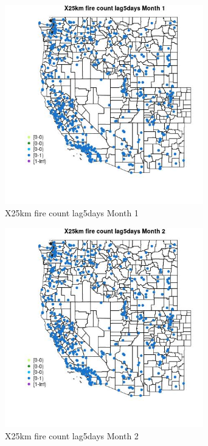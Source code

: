 \begin{figure} 
\centering  
\includegraphics[width=0.77\textwidth]{Code_Outputs/Report_ML_input_PM25_Step4_part_e_de_duplicated_aves_compiled_2019-05-14wNAs_MapObsMo1X25km_fire_count_lag5days.jpg} 
\caption{\label{fig:Report_ML_input_PM25_Step4_part_e_de_duplicated_aves_compiled_2019-05-14wNAsMapObsMo1X25km_fire_count_lag5days}X25km fire count lag5days Month 1} 
\end{figure} 
 

\begin{figure} 
\centering  
\includegraphics[width=0.77\textwidth]{Code_Outputs/Report_ML_input_PM25_Step4_part_e_de_duplicated_aves_compiled_2019-05-14wNAs_MapObsMo2X25km_fire_count_lag5days.jpg} 
\caption{\label{fig:Report_ML_input_PM25_Step4_part_e_de_duplicated_aves_compiled_2019-05-14wNAsMapObsMo2X25km_fire_count_lag5days}X25km fire count lag5days Month 2} 
\end{figure} 
 

